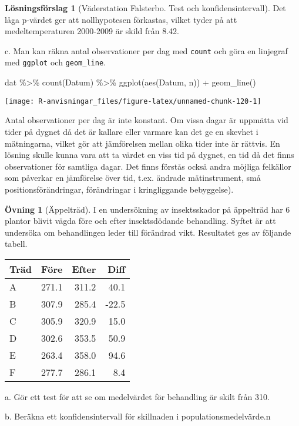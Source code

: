 \documentclass[
]{book}
\newenvironment{Shaded}{\begin{snugshade}}{\end{snugshade}}
\newcommand{\FunctionTok}[1]{\textcolor[rgb]{0.00,0.00,0.00}{#1}}
\newcommand{\NormalTok}[1]{#1}
\newcommand{\SpecialCharTok}[1]{\textcolor[rgb]{0.00,0.00,0.00}{#1}}
\theoremstyle{definition}
\theoremstyle{definition}
\theoremstyle{definition}
\newtheorem{exercise}{Övning}[chapter]
\theoremstyle{definition}
\newtheorem{hypothesis}{Lösningsförslag}[chapter]
\theoremstyle{remark}
\begin{document}
\begin{hypothesis}[Väderstation Falsterbo. Test och konfidensintervall]
Det låga p-värdet ger att nollhypotesen förkastas, vilket tyder på att medeltemperaturen 2000-2009 är skild från 8.42.

c. Man kan räkna antal observationer per dag med \texttt{count} och göra en linjegraf med \texttt{ggplot} och \texttt{geom\_line}.

\begin{Shaded}
\begin{Highlighting}[]
\NormalTok{dat }\SpecialCharTok{\%\textgreater{}\%} \FunctionTok{count}\NormalTok{(Datum) }\SpecialCharTok{\%\textgreater{}\%} \FunctionTok{ggplot}\NormalTok{(}\FunctionTok{aes}\NormalTok{(Datum, n)) }\SpecialCharTok{+} \FunctionTok{geom\_line}\NormalTok{()}
\end{Highlighting}
\end{Shaded}

\begin{center}\texttt{[image: R-anvisningar\_files/figure-latex/unnamed-chunk-120-1]} \end{center}

Antal observationer per dag är inte konstant. Om vissa dagar är uppmätta vid tider på dygnet då det är kallare eller varmare kan det ge en skevhet i mätningarna, vilket gör att jämförelsen mellan olika tider inte är rättvis. En lösning skulle kunna vara att ta värdet en viss tid på dygnet, en tid då det finns observationer för samtliga dagar. Det finns förstås också andra möjliga felkällor som påverkar en jämförelse över tid, t.ex. ändrade mätinstrument, små positionsförändringar, förändringar i kringliggande bebyggelse).
\end{hypothesis}

\begin{exercise}[Äppelträd]
I en undersökning av insektsskador på äppelträd har 6 plantor blivit vägda före och efter insektsdödande behandling. Syftet är att undersöka om behandlingen leder till förändrad vikt. Resultatet ges av följande tabell.

\begin{table}
\centering
\begin{tabular}[t]{lrrr}
\toprule
Träd & Före & Efter & Diff\\
\midrule
A & 271.1 & 311.2 & 40.1\\
B & 307.9 & 285.4 & -22.5\\
C & 305.9 & 320.9 & 15.0\\
D & 302.6 & 353.5 & 50.9\\
E & 263.4 & 358.0 & 94.6\\
\addlinespace
F & 277.7 & 286.1 & 8.4\\
\bottomrule
\end{tabular}
\end{table}

a. Gör ett test för att se om medelvärdet för behandling är skilt från 310.

b. Beräkna ett konfidensintervall för skillnaden i populationsmedelvärde.n
\end{exercise}
\end{document}
